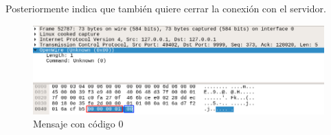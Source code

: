 \documentclass[12pt]{article}
\begin{document}
Posteriormente indica que también quiere cerrar la conexión con el servidor.
\begin{figure}[H]
  \centering
  \includegraphics[width=\textwidth]{32}
  \caption{Mensaje con código 0}
\end{figure}
\end{document}
